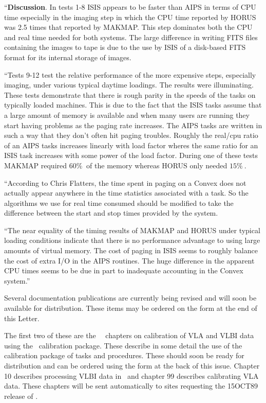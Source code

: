 {\narrower
``{\bf Discussion}. In tests 1-8 ISIS appears to be faster than AIPS in
terms of CPU time especially in the imaging step in which the CPU time
reported by HORUS was 2.5 times that reported by MAKMAP.  This step dominates
both the CPU and real time needed for both systems.  The large
difference in writing FITS files containing the images to tape is due
to the use by ISIS of a disk-based FITS format for its internal
storage of images.

   ``Tests 9-12 test the relative performance of the more expensive
steps, especially imaging, under various typical daytime loadings.
The results were illuminating.  These tests demonstrate that there is
rough parity in the speeds of the tasks on typically loaded machines.
This is due to the fact that the ISIS tasks assume that a large amount
of memory is available and when many users are running they start
having problems as the paging rate increases. The AIPS tasks are
written in such a way that they don't often hit paging troubles.
Roughly the real/cpu ratio of an AIPS tasks increases linearly with
load factor wheres the same ratio for an ISIS task increases with some
power of the load factor.  During one of these tests MAKMAP required
$60\%\ $ of the memory whereas HORUS only needed $15\%\ $.

``According to Chris Flatters, the time spent in paging on a Convex does
not actually appear anywhere in the time statistics associated with
a task. So the algorithms we use for real time consumed should be
modified to take the difference between the start and stop times
provided by the system.

``The near equality of the timing results of MAKMAP and HORUS under
typical loading conditions indicate that there is no performance
advantage to using large amounts of virtual memory.  The cost of
paging in ISIS seems to roughly balance the cost of extra I/O in the
AIPS routines.  The huge difference in the apparent CPU times seems to
be due in part to inadequate accounting in the Convex system.''

}


   Several documentation publications are currently being revised and
will soon be available for distribution.  These items may be ordered
on the form at the end of this \AIPS Letter.

   The first two of these are the \AIPS\  \Cookbook\ chapters on
calibration of VLA and VLBI data using the \AIPS\  calibration package.
These describe in some detail the use of the calibration package of
tasks and procedures.  These should soon be ready for distribution and
can be ordered using the form at the back of this issue.  Chapter 10
describes processing VLBI data in \AIPS\ and chapter 99 describes
calibrating VLA data.  These chapters will be sent automatically to
sites requesting the 15OCT89 release of \AIPS.

